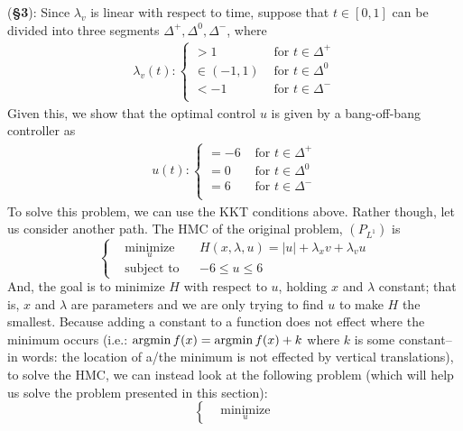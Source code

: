 \documentclass[10pt]{article}
\newcommand{\piece}[2][cll]{\left \{\begin{array}{#1} #2\\ \end{array} \right. }
\newcommand{\abs}[1]{ \left|#1\right|}
\newcommand{\argmin}{\operatornamewithlimits{argmin}}
\begin{document}
\begin{enumerate}[leftmargin=*]
    (\textbf{\S3}): Since $\lambda_v$ is linear with respect to time, suppose that $t\in[0,1]$ can be divided into three segments $\Delta^+,\Delta^0,\Delta^-$, where
    \begin{align*}
        \lambda_v(t) : \piece{ >1 & \text{ for $t\in\Delta^+$}\\
                               \in(-1,1) & \text{ for $t\in\Delta^0$}\\
                               <-1 & \text{ for $t\in\Delta^-$}
                       }
    \end{align*}
    Given this, we show that the optimal control $u$ is given by a bang-off-bang controller as
    \begin{align*}
        u(t): \piece{ =-6 & \text{ for $t\in\Delta^+$}\\
                      = 0 & \text{ for $t\in\Delta^0$}\\
                      = 6 & \text{ for $t\in\Delta^-$}
                       }
    \end{align*}
    To solve this problem, we can use the KKT conditions above.  Rather though, let us consider another path.  The HMC of the original problem, $(P_{L^1})$ is
    \begin{equation}
                  \left\{
                        \begin{aligned}
                            & \underset{u}{\text{minimize}}
                            & & H(x,\lambda,u)=\abs{u}+\lambda_xv+\lambda_vu \\
                            & \text{subject to}
                            & & -6\le u \le 6
                            \end{aligned}
                  \right.
    \end{equation}
    And, the goal is to minimize $H$ with respect to $u$, holding $x$ and $\lambda$ constant; that is, $x$ and $\lambda$ are parameters and we are only trying to find $u$ to make $H$ the smallest.  Because adding a constant to a function does not effect where the minimum occurs (i.e.: $\argmin{f(x)}=\argmin{f(x)+k}$ where $k$ is some constant--in words: the location of a/the minimum is not effected by vertical translations), to solve the HMC, we can instead look at the following problem (which will help us solve the problem presented in this section):
    \begin{equation}
                  \left\{
                        \begin{aligned}
                            & \underset{u}{\text{minimize}}

\end{aligned}
\end{equation}
\end{enumerate}
\end{document}
